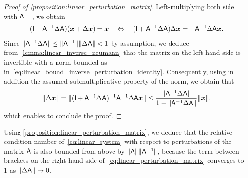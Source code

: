 \begin{proof}
    [Proof of \cref{proposition:linear_perturbation_matrix}]
    Left-multiplying both side with $\mathsf A^{-1}$,
    we obtain
    \begin{equation}
        \label{eq:linear_perturbation_matrix_initial}
        (\mathsf I + \mathsf A^{-1} \Delta \mathsf A) (\mathbf{\boldsymbol{x}} + \Delta \mathbf{\boldsymbol{x}}) = \mathbf{\boldsymbol{x}}
        \quad \Leftrightarrow \quad
        (\mathsf I + \mathsf A^{-1} \Delta \mathsf A) \Delta \mathbf{\boldsymbol{x}} = - \mathsf A^{-1} \Delta \mathsf A \mathbf{\boldsymbol{x}}.
    \end{equation}
    Since $\lVert\mathsf A^{-1} \Delta \mathsf A\rVert \leq \lVert\mathsf A^{-1}\rVert \lVert\Delta \mathsf A\rVert < 1$ by assumption,
    we deduce from~\cref{lemma:linear_inverse_neumann} that the matrix on the left-hand side is invertible
    with a norm bounded as in~\eqref{eq:linear_bound_inverse_perturbation_identity}.
    Consequently,
    using in addition the assumed submultiplicative property of the norm,
    we obtain that
    \[
        \lVert\Delta \mathbf{\boldsymbol{x}}\rVert
        = \lVert(\mathsf I + \mathsf A^{-1} \Delta \mathsf A)^{-1} \mathsf A^{-1} \Delta \mathsf A \mathbf{\boldsymbol{x}}\rVert
        \leq \frac{\lVert\mathsf A^{-1} \Delta \mathsf A\rVert}{1 - \lVert\mathsf A^{-1} \Delta \mathsf A\rVert} \lVert\mathbf{\boldsymbol{x}}\rVert.
    \]
    which enables to conclude the proof.
\end{proof}
Using \cref{proposition:linear_perturbation_matrix},
we deduce that the relative condition number of~\eqref{eq:linear_system} with respect to perturbations of the matrix $\mathsf A$ is also bounded from above by $\lVert\mathsf A\rVert \lVert\mathsf A^{-1}\rVert$,
because the term between brackets on the right-hand side of~\eqref{eq:linear_perturbation_matrix} converges to 1 as $\lVert\Delta \mathsf A\rVert \to 0$.


